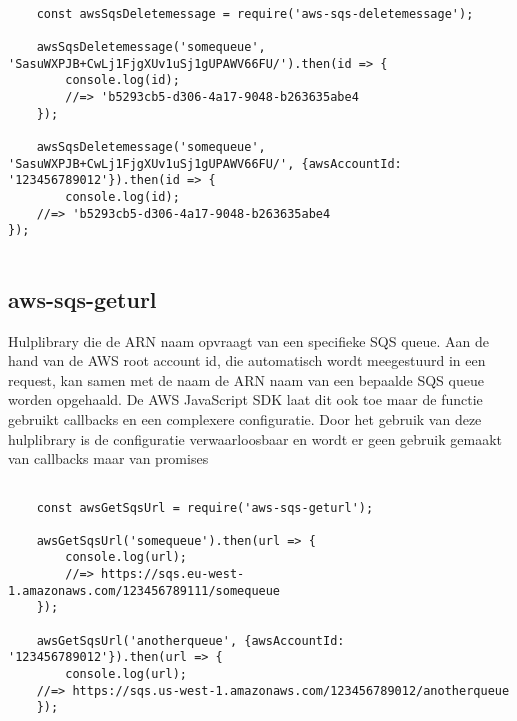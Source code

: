 \begin{lstlisting}[caption=Voorbeeld hoe een bericht wordt verwijderd van SQS nadat het is verwerkt]

	const awsSqsDeletemessage = require('aws-sqs-deletemessage');

	awsSqsDeletemessage('somequeue', 'SasuWXPJB+CwLj1FjgXUv1uSj1gUPAWV66FU/').then(id => {
		console.log(id);
		//=> 'b5293cb5-d306-4a17-9048-b263635abe4
	});

	awsSqsDeletemessage('somequeue', 'SasuWXPJB+CwLj1FjgXUv1uSj1gUPAWV66FU/', {awsAccountId: '123456789012'}).then(id => {
		console.log(id);
	//=> 'b5293cb5-d306-4a17-9048-b263635abe4
});
	
\end{lstlisting}

\subsection{aws-sqs-geturl}
Hulplibrary die de ARN naam opvraagt van een specifieke SQS queue. Aan de hand van de AWS root account id, die automatisch wordt meegestuurd in een request, kan samen met de naam de ARN naam van een bepaalde SQS queue worden opgehaald. De AWS JavaScript SDK laat dit ook toe maar de functie gebruikt callbacks en een complexere configuratie. Door het gebruik van deze hulplibrary is de configuratie verwaarloosbaar en wordt er geen gebruik gemaakt van callbacks maar van promises

\begin{lstlisting}[caption=Voorbeeld hoe de ARN van een SQS wordt opgehaald]

	const awsGetSqsUrl = require('aws-sqs-geturl');

	awsGetSqsUrl('somequeue').then(url => {
		console.log(url);
		//=> https://sqs.eu-west-1.amazonaws.com/123456789111/somequeue
	});

	awsGetSqsUrl('anotherqueue', {awsAccountId: '123456789012'}).then(url => {
		console.log(url);
	//=> https://sqs.us-west-1.amazonaws.com/123456789012/anotherqueue
	});
	
\end{lstlisting}
